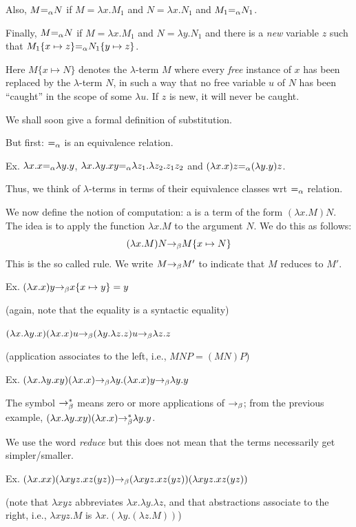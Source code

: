 \begin{frame}
Also, $M{=_\alpha} N$ if $M=\lambda x.M_1$ and $N=\lambda x.N_1$ and
$M_1{=_\alpha} N_1$.

Finally, $M{=_\alpha} N$ if $M=\lambda x.M_1$ and $N=\lambda y.N_1$ and
there is a {\em new} variable $z$ such that $M_1\{x\mapsto z\}{=_\alpha}
N_1\{y\mapsto z\}$.

Here $M\{x\mapsto N\}$ denotes the $\lambda$-term $M$ where every {\em
free} instance of $x$ has been replaced by the $\lambda$-term $N$, in
such a way that no free variable $u$ of $N$ has been ``caught'' in the
scope of some $\lambda u$.  If $z$ is new, it will never be caught.

We shall soon give a formal definition of substitution.

But first: ${=_\alpha}$ is an equivalence relation.  

Ex. $\lambda x.x{=_\alpha} \lambda y.y$, $\lambda x.\lambda y.xy{=_\alpha} \lambda
z_1.\lambda z_2.z_1z_2$ and $(\lambda x.x)z{=_\alpha}(\lambda y.y)z$.

Thus, we think of $\lambda$-terms in terms of their equivalence
classes wrt ${=_\alpha}$ relation.
\end{frame}

\begin{frame}
We now define the notion of computation: a  is a term of the
form $(\lambda x.M)N$.  The idea is to apply the function $\lambda
x.M$ to the argument $N$.  We do this as follows:
$$
(\lambda x.M)N{\rightarrow_\beta} M\{x\mapsto N\}
$$
This is the so called  rule.  We write $M{\rightarrow_\beta}
M'$ to indicate that $M$ reduces to $M'$.

Ex. $(\lambda x.x)y{\rightarrow_\beta} x\{x\mapsto y\}=y$

(again, note that the equality is a syntactic equality)

$(\lambda x.\lambda y.x)(\lambda x.x)u
{\rightarrow_\beta}(\lambda y.\lambda z.z)u
{\rightarrow_\beta}\lambda z.z$

(application associates to the left, i.e., $MNP=(MN)P$)
\end{frame}

\begin{frame}
Ex. $(\lambda x.\lambda y.xy)(\lambda x.x)
{\rightarrow_\beta}\lambda y.(\lambda x.x)y
{\rightarrow_\beta}\lambda y.y$

The symbol ${\rightarrow^*_\beta}$ means zero or more applications of ${\rightarrow_\beta}$; from
the previous example,
$(\lambda x.\lambda y.xy)(\lambda x.x){\rightarrow^*_\beta}\lambda y.y$.

We use the word {\em reduce} but this does not mean that the terms
necessarily get simpler/smaller.

Ex. $(\lambda x.xx)(\lambda xyz.xz(yz))
{\rightarrow_\beta}(\lambda xyz.xz(yz))(\lambda xyz.xz(yz))$

(note that $\lambda xyz$ abbreviates $\lambda x.\lambda y.\lambda z$,
and that abstractions associate to the right, i.e., $\lambda xyz.M$ is
$\lambda x.(\lambda y.(\lambda z.M))$)
\end{frame}

